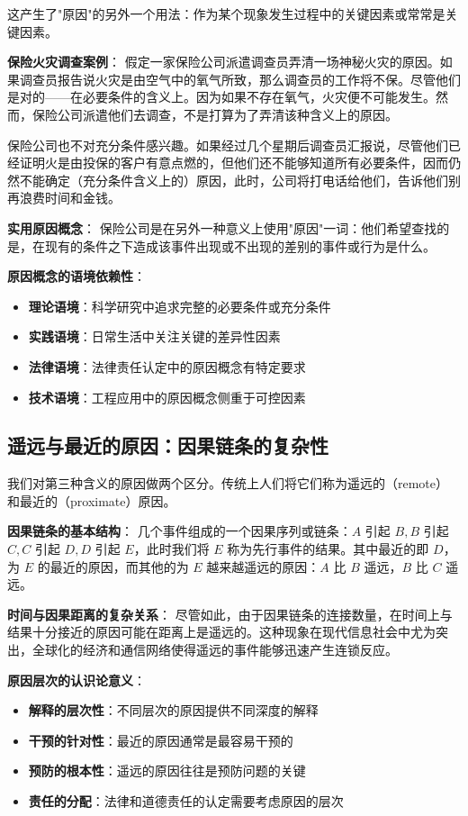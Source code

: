 \begin{examplebox}[title=保险调查中的原因概念]
这产生了"原因"的另外一个用法：作为某个现象发生过程中的关键因素或常常是关键因素。

\textbf{保险火灾调查案例}：
假定一家保险公司派遣调查员弄清一场神秘火灾的原因。如果调查员报告说火灾是由空气中的氧气所致，那么调查员的工作将不保。尽管他们是对的——在必要条件的含义上。因为如果不存在氧气，火灾便不可能发生。然而，保险公司派遣他们去调查，不是打算为了弄清该种含义上的原因。

保险公司也不对充分条件感兴趣。如果经过几个星期后调查员汇报说，尽管他们已经证明火是由投保的客户有意点燃的，但他们还不能够知道所有必要条件，因而仍然不能确定（充分条件含义上的）原因，此时，公司将打电话给他们，告诉他们别再浪费时间和金钱。

\textbf{实用原因概念}：
保险公司是在另外一种意义上使用"原因"一词：他们希望查找的是，在现有的条件之下造成该事件出现或不出现的差别的事件或行为是什么。

\textbf{原因概念的语境依赖性}：
\begin{itemize}
\item \textbf{理论语境}：科学研究中追求完整的必要条件或充分条件
\item \textbf{实践语境}：日常生活中关注关键的差异性因素
\item \textbf{法律语境}：法律责任认定中的原因概念有特定要求
\item \textbf{技术语境}：工程应用中的原因概念侧重于可控因素
\end{itemize}
\end{examplebox}

\subsection{遥远与最近的原因：因果链条的复杂性}

\begin{theorembox}[title=因果链条中的原因层次]
我们对第三种含义的原因做两个区分。传统上人们将它们称为遥远的（remote）和最近的（proximate）原因。

\textbf{因果链条的基本结构}：
几个事件组成的一个因果序列或链条：$A$ 引起 $B, B$ 引起 $C, C$ 引起 $D, D$ 引起 $E$，此时我们将 $E$ 称为先行事件的结果。其中最近的即 $D$，为 $E$ 的最近的原因，而其他的为 $E$ 越来越遥远的原因：$A$ 比 $B$ 遥远，$B$ 比 $C$ 遥远。

\textbf{时间与因果距离的复杂关系}：
尽管如此，由于因果链条的连接数量，在时间上与结果十分接近的原因可能在距离上是遥远的。这种现象在现代信息社会中尤为突出，全球化的经济和通信网络使得遥远的事件能够迅速产生连锁反应。

\textbf{原因层次的认识论意义}：
\begin{itemize}
\item \textbf{解释的层次性}：不同层次的原因提供不同深度的解释
\item \textbf{干预的针对性}：最近的原因通常是最容易干预的
\item \textbf{预防的根本性}：遥远的原因往往是预防问题的关键
\item \textbf{责任的分配}：法律和道德责任的认定需要考虑原因的层次
\end{itemize}
\end{theorembox}

